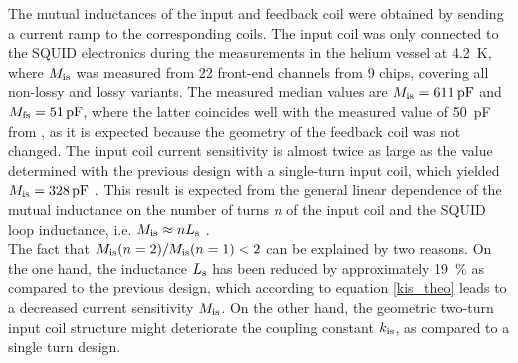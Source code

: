 The mutual inductances of the input and feedback coil were obtained by sending a current ramp to the corresponding coils. The input coil was only connected to the SQUID electronics during the measurements in the helium vessel at \qty{4.2}{\kelvin}, where $M_{\rm is}$ was measured from 22 front-end channels from 9 chips, covering all non-lossy and lossy variants. The measured median values are $M_{\rm is}=\qty{611}{\pico\farad}$ and $M_{\rm fs}=\qty{51}{\pico\farad}$, where the latter coincides well with the measured value of \qty{50}{\pico\farad} from \cite{Bauer2022}, as it is expected because the geometry of the feedback coil was not changed. The input coil current sensitivity is almost twice as large as the value determined with the previous design with a single-turn input coil, which yielded $M_{\rm is}=\qty{328}{\pico\farad}$ \cite{Bauer2022}. This result is expected from the general linear dependence of the mutual inductance on the number of turns \textit{n} of the input coil and the SQUID loop inductance, i.e. $M_{\rm is}\approx nL_{\rm s}$ \cite{Ketchen1981}. 
\\ The fact that $M_{\rm is}(n=2)/M_{\rm is}(n=1)<2$ can be explained by two reasons. On the one hand, the inductance $L_{\rm s}$ has been reduced by approximately \qty{19}{\percent} as compared to the previous design, which according to equation \ref{kis_theo} leads to a decreased current sensitivity $M_{\rm is}$. On the other hand, the geometric two-turn input coil structure might deteriorate the coupling constant $k_{\rm is}$, as compared to a single turn design.

